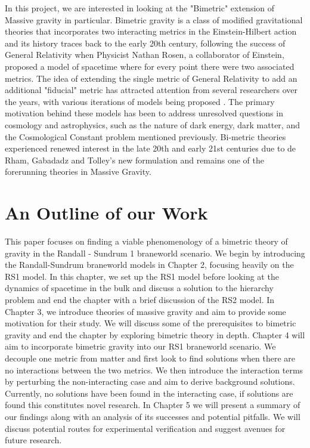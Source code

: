 \documentclass[11pt]{report}
\numberwithin{equation}{chapter}
\begin{document}
\noindent In this project, we are interested in looking at the "Bimetric" extension of Massive gravity in particular. Bimetric gravity is a class of modified gravitational theories that incorporates two interacting metrics in the Einstein-Hilbert action and its history traces back to the early 20th century, following the success of General Relativity when Physicist Nathan Rosen\cite{PhysRev.57.147}\cite{PhysRev.57.150}, a collaborator of Einstein, proposed a model of spacetime where for every point there were two associated metrics. The idea of extending the single metric of General Relativity to add an additional "fiducial" metric has attracted attention from several researchers over the years, with various iterations of models being proposed \cite{PhysRevD.80.123536}. The primary motivation behind these models has been to address unresolved questions in cosmology and astrophysics, such as the nature of dark energy, dark matter, and the Cosmological Constant problem mentioned previously. Bi-metric theories experienced renewed interest in the late 20th and early 21st centuries due to de Rham, Gabadadz and Tolley's new formulation and remains one of the forerunning theories in Massive Gravity. 

\section{An Outline of our Work}
This paper focuses on finding a viable phenomenology of a bimetric theory of gravity in the Randall - Sundrum 1 braneworld scenario. We begin by introducing the Randall-Sundrum braneworld models in Chapter 2, focusing heavily on the RS1 model. In this chapter, we set up the RS1 model before looking at the dynamics of spacetime in the bulk and discuss a solution to the hierarchy problem and end the chapter with a brief discussion of the RS2 model. In Chapter 3, we introduce theories of massive gravity and aim to provide some motivation for their study. We will discuss some of the prerequisites to bimetric gravity and end the chapter by exploring bimetric theory in depth. Chapter 4 will aim to incorporate bimetric gravity into our RS1 braneworld scenario. We decouple one metric from matter and first look to find solutions when there are no interactions between the two metrics. We then introduce the interaction terms by perturbing the non-interacting case and aim to derive background solutions. Currently, no solutions have been found in the interacting case, if solutions are found this constitutes novel research. In Chapter 5 we will present a summary of our findings along with an analysis of its successes and potential pitfalls. We will discuss potential routes for experimental verification and suggest avenues for future research.
\end{document}
